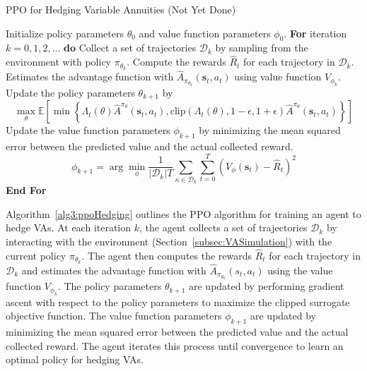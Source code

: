 \begin{algorithm} 
    \caption{PPO for Hedging Variable Annuities (Not Yet Done)} 
    \begin{algorithmic}[1] \label{alg3:ppoHedging}
        \STATE  Initialize policy parameters $\theta_0$ and value function parameters $\phi_0$.
        \STATE  \textbf{For} {iteration $k=0, 1,2,\ldots$} \textbf{do}
        \STATE  \quad Collect a set of trajectories $\mathcal{D}_k$ by sampling from the environment with policy $\pi_{\theta_{k}}$.
        \STATE  \quad Compute the rewards $\hat{R}_t$ for each trajectory in $\mathcal{D}_k$.
        \STATE  \quad Estimates the advantage function with $\hat{A}_{\pi_{\theta_k}}(\mathbf{s}_t, a_t)$ using value function $V_{\phi_k}$.
        \STATE  \quad Update the policy parameters $\theta_{k+1}$ by 
        \begin{equation*}
            \max_{\theta} \mathbb{E}\left[ \min \left\{ \Lambda_t(\theta)\hat{A}^{\pi_{\theta}}(\mathbf{s}_t, a_t), \text{clip}(\Lambda_t(\theta), 1-\epsilon, 1 + \epsilon) \hat{A}^{\pi_{\theta}}(\mathbf{s}_t, a_t)  \right\} \right]
        \end{equation*}
        \STATE  \quad Update the value function parameters $\phi_{k+1}$ by minimizing the mean squared error between the predicted value and the actual collected reward.
        \begin{equation*}
            \phi_{k+1} = \arg \min_{\phi} \frac{1}{|\mathcal{D}_k|T} \sum_{\mathcal{\kappa} \in \mathcal{D}_k} \sum_{t=0}^{T} \left( V_{\phi}(\mathbf{s}_t) - \hat{R}_t \right)^2
        \end{equation*}
        \STATE  \textbf{End For}
    \end{algorithmic}
\end{algorithm}

Algorithm~\ref{alg3:ppoHedging} outlines the PPO algorithm for training an agent to hedge VAs.
At each iteration $k$, the agent collects a set of trajectories $\mathcal{D}_k$ by interacting with the environment (Section~\ref{subsec:VASimulation}) with the current policy $\pi_{\theta_k}$.
The agent then computes the rewards $\hat{R}_t$ for each trajectory in $\mathcal{D}_k$ and estimates the advantage function with $\hat{A}_{\pi_{\theta_k}}(s_t, a_t)$ using the value function $V_{\phi_k}$.
The policy parameters $\theta_{k+1}$ are updated by performing gradient ascent with respect to the policy parameters to maximize the clipped surrogate objective function.
The value function parameters $\phi_{k+1}$ are updated by minimizing the mean squared error between the predicted value and the actual collected reward.
The agent iterates this process until convergence to learn an optimal policy for hedging VAs.


